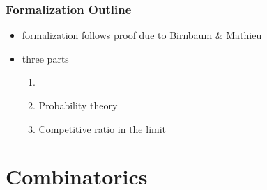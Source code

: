 \documentclass{beamer}
\begin{document}
\begin{frame}
  \frametitle{Formalization Outline}
  \begin{itemize}[<+->]
    \item formalization follows proof due to Birnbaum \& Mathieu~\cite{birnbaum2008}
    \item three parts
    \begin{enumerate}
      \item {} 
      \item Probability theory
      \item Competitive ratio in the limit
    \end{enumerate}
  \end{itemize}
\end{frame}

\section{Combinatorics}
\end{document}
